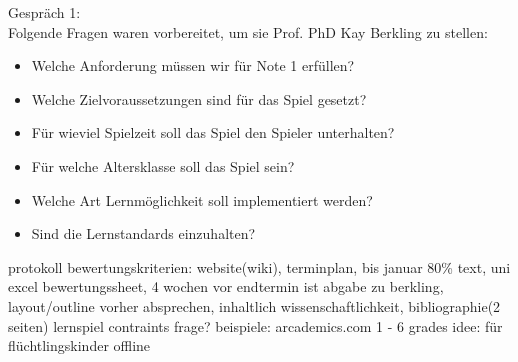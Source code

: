 Gespräch 1:\\
Folgende Fragen waren vorbereitet, um sie Prof. PhD Kay Berkling zu stellen:
\begin{itemize}
	\item Welche Anforderung müssen wir für Note 1 erfüllen?
	\item Welche Zielvoraussetzungen sind für das Spiel gesetzt?
	\item Für wieviel Spielzeit soll das Spiel den Spieler unterhalten?
	\item Für welche Altersklasse soll das Spiel sein?
	\item Welche Art Lernmöglichkeit soll implementiert werden?
	\item Sind die Lernstandards einzuhalten?
\end{itemize}


protokoll
	bewertungskriterien:
		website(wiki), terminplan, bis januar 80\% text, uni excel bewertungssheet, 4 wochen vor endtermin ist abgabe zu berkling, layout/outline vorher absprechen,
			inhaltlich
				wissenschaftlichkeit, bibliographie(2 seiten)
	lernspiel contraints frage?
		beispiele: arcademics.com
		1 - 6 grades
		idee:
			für flüchtlingskinder
			offline


